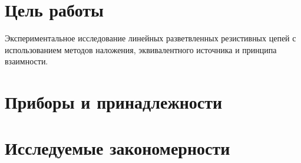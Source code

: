 \section{Цель работы}

Экспериментальное исследование линейных разветвленных
резистивных цепей с использованием методов наложения, эквивалентного 
источника и принципа взаимности.

\section{Приборы и принадлежности}

\section{Исследуемые закономерности}
